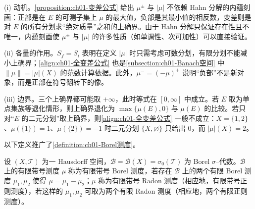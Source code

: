 \documentclass[../../main.tex]{subfiles}%
\begin{document}
\begin{remark}\label{remark:ch01-变差公式动机}
(i) 动机。\cref{proposition:ch01-变差公式} 给出 $\mu^\pm$ 与 $|\mu|$ 不依赖 Hahn 分解的内蕴刻画：正部是在 $E$ 的可测子集上 $\mu$ 的最大值，负部是其最小值的相反数，变差则是对 $E$ 的所有分划求“绝对质量”之和的上确界。由于 Hahn 分解只保证存在性且不唯一，内蕴刻画使 $\mu^\pm$ 与 $|\mu|$ 的许多性质（如单调性、次可加性）可以直接验证。

(ii) 各量的作用。$S_f=S_i$ 表明在定义 $|\mu|$ 时只需考虑可数分划，有限分划不能减小上确界；\eqref{align:ch01-全变差公式} 也是\cref{subsection:ch01-Banach空间} 中 $\|\mu\|=|\mu|(X)$ 的范数计算依据。此外，$\mu^-=(-\mu)^+$ 说明“负部”不是新对象，而是正部在符号翻转下的像。

(iii) 边界。三个上确界都可能取 $+\infty$，此时等式在 $[0,\infty]$ 中成立。若 $E$ 取为单点集族等退化情形，则上确界退化为 $\max\{\mu(E),0\}$ 与 $\mu(E)$ 的比较。若只对“$E$ 的二元分划”取上确界，则\eqref{align:ch01-全变差公式} 一般不成立：$X=\{1,2\}$、$\mu(\{1\})=1$、$\mu(\{2\})=-1$ 时二元分划 $\{X,\varnothing\}$ 只给出 $0$，而 $|\mu|(X)=2$。
\end{remark}

以下定义推广了\cref{definition:ch01-Borel测度}。

\begin{definition}\label{definition:ch01-有限带号Borel}\label{definition:ch01-带号Radon测度}
设 $(X,\mathcal{T})$ 为一 Hausdorff 空间，$\mathcal{B}=\mathcal{B}(X)=\sigma_0(\mathcal{T})$ 为 Borel $\sigma$--代数。$\mathcal{B}$ 上的有限带号测度 $\mu$ 称为有限带号 Borel 测度，若存在 $\mathcal{B}$ 上的两个有限 Borel 测度 $\mu_1,\mu_2$ 使得 $\mu=\mu_1-\mu_2$；$\mu$ 称为有限带号 Radon 测度（相应地，有限带号正则测度），若这样的 $\mu_1,\mu_2$ 可取为两个有限 Radon 测度（相应地，两个有限正则测度）。
\end{definition}
\end{document}
